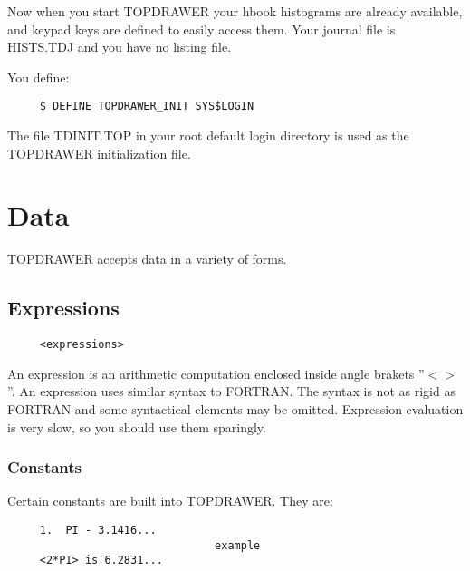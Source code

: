 Now  when  you start TOPDRAWER your hbook histograms are already available,
and keypad keys are defined to easily access them.  Your  journal  file  is
HISTS.TDJ and you have no listing file.  

You define:  
\begin{verbatim}
     $ DEFINE TOPDRAWER_INIT SYS$LOGIN 
\end{verbatim}
The  file  TDINIT.TOP  in  your root default login directory is used as the
TOPDRAWER initialization file.  
\section{Data}
TOPDRAWER accepts data in a variety of forms.  
\subsection{Expressions}
\begin{verbatim}
     <expressions>
\end{verbatim}
An  expression is an arithmetic computation enclosed inside angle brakets
''$<$$>$''.  An expression uses similar syntax to FORTRAN.  The syntax  is  not
as  rigid  as  FORTRAN  and  some  syntactical  elements  may be omitted.
Expression evaluation is very slow, so you should use them sparingly.  
\subsubsection{Constants}
Certain constants are built into TOPDRAWER.  They are:  
\begin{verbatim}
     1.  PI - 3.1416...  
                                example
     <2*PI> is 6.2831...  
\end{verbatim}
